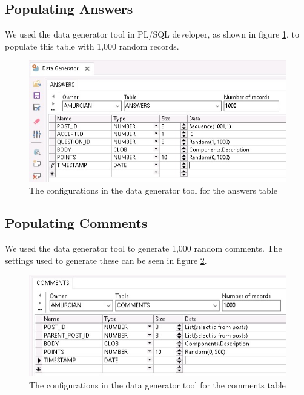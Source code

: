 \subsection{Populating Answers}

We used the data generator tool in PL/SQL developer, as shown in figure \ref{answers-generator}, to populate this table with 1,000 random records.

\begin{figure}[htbp]
	\centering
	\includegraphics[width=\linewidth]{images/answers_generator.jpeg}
	\caption{The configurations in the data generator tool for the answers table}
	\label{answers-generator}
\end{figure}

\subsection{Populating Comments}

We used the data generator tool to generate 1,000 random comments. The settings used to generate these can be seen in figure \ref{comments-generator}.

\begin{figure}[htbp]
	\centering
	\includegraphics[width=\linewidth]{images/comments_generator.jpeg}
	\caption{The configurations in the data generator tool for the comments table}
	\label{comments-generator}
\end{figure}

